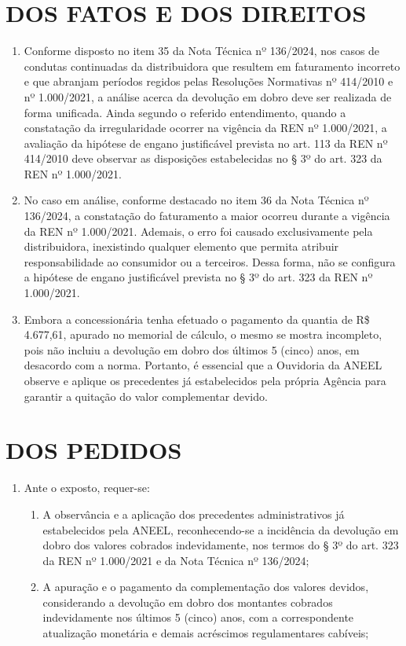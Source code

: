 \newcommand{\tipoRequerimento}{Contestação do memorial de cálculo, pagamento complementar do dobro}

\section{DOS FATOS E DOS DIREITOS}

\begin{enumerate}[resume]
\item Conforme disposto no item 35 da Nota Técnica nº 136/2024, nos casos de condutas continuadas da distribuidora que resultem em faturamento incorreto e que abranjam períodos regidos pelas Resoluções Normativas nº 414/2010 e nº 1.000/2021, a análise acerca da devolução em dobro deve ser realizada de forma unificada. Ainda segundo o referido entendimento, quando a constatação da irregularidade ocorrer na vigência da REN nº 1.000/2021, a avaliação da hipótese de engano justificável prevista no art. 113 da REN nº 414/2010 deve observar as disposições estabelecidas no § 3º do art. 323 da REN nº 1.000/2021.
\item No caso em análise, conforme destacado no item 36 da Nota Técnica nº 136/2024, a constatação do faturamento a maior ocorreu durante a vigência da REN nº 1.000/2021. Ademais, o erro foi causado exclusivamente pela distribuidora, inexistindo qualquer elemento que permita atribuir responsabilidade ao consumidor ou a terceiros. Dessa forma, não se configura a hipótese de engano justificável prevista no § 3º do art. 323 da REN nº 1.000/2021. 
\item Embora a concessionária tenha efetuado o pagamento da quantia de  R\$ 4.677,61, apurado no memorial de cálculo, o mesmo se mostra incompleto, pois não incluiu a devolução em dobro dos últimos 5 (cinco) anos, em desacordo com a norma. Portanto, é essencial que a Ouvidoria da ANEEL observe e aplique os precedentes já estabelecidos pela própria Agência para garantir a quitação do valor complementar devido.
\end{enumerate}

\section{DOS PEDIDOS}

\begin{enumerate}[resume]
\item Ante o exposto, requer-se:
    \begin{enumerate}
    \item A observância e a aplicação dos precedentes administrativos já estabelecidos pela ANEEL, reconhecendo-se a incidência da devolução em dobro dos valores cobrados indevidamente, nos termos do § 3º do art. 323 da REN nº 1.000/2021 e da Nota Técnica nº 136/2024;
    \item A apuração e o pagamento da complementação dos valores devidos, considerando a devolução em dobro dos montantes cobrados indevidamente nos últimos 5 (cinco) anos, com a correspondente atualização monetária e demais acréscimos regulamentares cabíveis;

    \end{enumerate}
\end{enumerate}